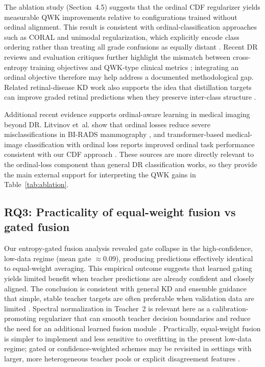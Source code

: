 \documentclass[a4paper,fleqn]{cas-dc}
\begin{document}
The ablation study (Section~4.5) suggests that the ordinal CDF regularizer yields measurable QWK improvements relative to configurations trained without ordinal alignment. This result is consistent with ordinal-classification approaches such as CORAL and unimodal regularization, which explicitly encode class ordering rather than treating all grade confusions as equally distant \cite{cao2020,liu2020}. Recent DR reviews and evaluation critiques further highlight the mismatch between cross-entropy training objectives and QWK-type clinical metrics \cite{bappi2025,zhu2024}; integrating an ordinal objective therefore may help address a documented methodological gap. Related retinal-disease KD work also supports the idea that distillation targets can improve graded retinal predictions when they preserve inter-class structure \cite{ju2021,luo2020}.

Additional recent evidence supports ordinal-aware learning in medical imaging beyond DR. Litvinov et~al. show that ordinal losses reduce severe misclassifications in BI-RADS mammography \cite{litvinov2026}, and transformer-based medical-image classification with ordinal loss reports improved ordinal task performance consistent with our CDF approach \cite{liu_medvit2024}. These sources are more directly relevant to the ordinal-loss component than general DR classification works, so they provide the main external support for interpreting the QWK gains in Table~\ref{tab:ablation}.

\subsection{RQ3: Practicality of equal-weight fusion vs gated fusion}

Our entropy-gated fusion analysis revealed gate collapse in the high-confidence, low-data regime (mean gate $\approx 0.09$), producing predictions effectively identical to equal-weight averaging. This empirical outcome suggests that learned gating yields limited benefit when teacher predictions are already confident and closely aligned. The conclusion is consistent with general KD and ensemble guidance that simple, stable teacher targets are often preferable when validation data are limited \cite{gou2021,zhou2012,kuncheva2014}. Spectral normalization in Teacher~2 is relevant here as a calibration-promoting regularizer that can smooth teacher decision boundaries and reduce the need for an additional learned fusion module \cite{miyato2018}. Practically, equal-weight fusion is simpler to implement and less sensitive to overfitting in the present low-data regime; gated or confidence-weighted schemes may be revisited in settings with larger, more heterogeneous teacher pools or explicit disagreement features \cite{li2024,hossain2025,yang2025}.
\end{document}
